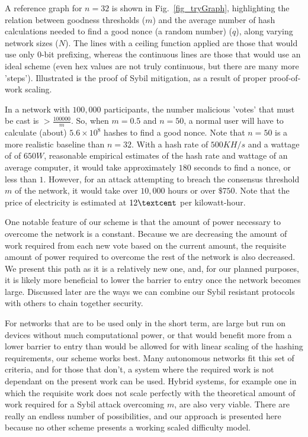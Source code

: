 \documentclass[10pt]{IEEEtran}
\begin{document}
\par A reference graph for $n = 32$ is shown in Fig.~\ref{fig_tryGraph}, highlighting the relation between goodness thresholds ($m$) and the average number of hash calculations needed to find a good nonce (a random number) ($q$), along varying network sizes ($N$). The lines with a ceiling function applied are those that would use only $0$-bit prefixing, whereas the continuous lines are those that would use an ideal scheme (even hex values are not truly continuous, but there are many more 'steps'). Illustrated is the proof of Sybil mitigation, as a result of proper proof-of-work scaling.

\par In a network with $100,000$ participants, the number malicious 'votes' that must be cast is $ > \frac{100000}{m}$. So, when $m = 0.5$ and $n = 50$, a normal user will have to calculate (about) $5.6\times{}10^8$ hashes to find a good nonce. Note that $n = 50$ is a more realistic baseline than $n = 32$. With a hash rate of $500KH/s$ and a wattage of of $650W$, reasonable empirical estimates of the hash rate and wattage of an average computer, it would take approximately $180$ seconds to find a nonce, or less than $1$\textcent. However, for an attack attempting to breach the consensus threshold $m$ of the network, it would take over $10,000$ hours or over $\$750$. Note that the price of electricity is estimated at $12\textcent$ per kilowatt-hour. 

\par One notable feature of our scheme is that the amount of power necessary to overcome the network is a constant. Because we are decreasing the amount of work required from each new vote based on the current amount, the requisite amount of power required to overcome the rest of the network is also decreased. We present this path as it is a relatively new one, and, for our planned purposes, it is likely more beneficial to lower the barrier to entry once the network becomes large. Discussed later  are the ways we can combine our Sybil resistant protocols with others to chain together security. 
\par For networks that are to be used only in the short term, are large but run on devices without much computational power, or that would benefit more from a lower barrier to entry than would be allowed for with linear scaling of the hashing requirements, our scheme works best. Many autonomous networks fit this set of criteria, and for those that don't, a system where the required work is not dependant on the present work can be used. Hybrid systems, for example one in which the requisite work does not scale perfectly with the theoretical amount of work required for a Sybil attack overcoming $m$, are also very viable. There are really an endless number of possibilities, and our approach is presented here because no other scheme presents a working scaled difficulty model.
\end{document}

